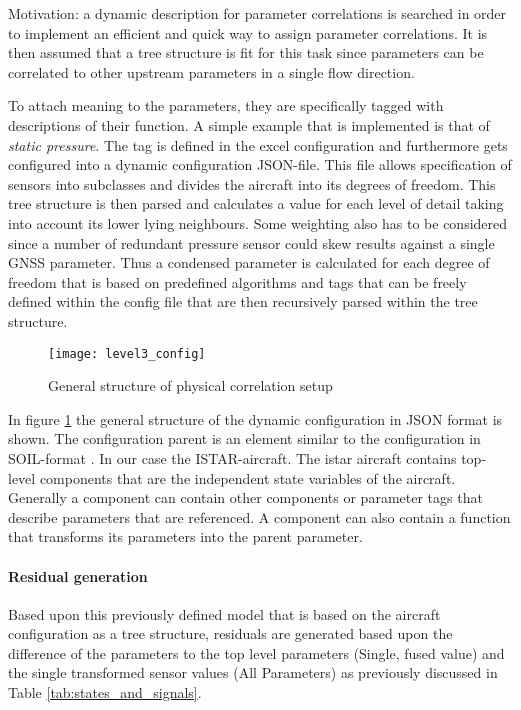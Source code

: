 Motivation: a dynamic description for parameter correlations is searched in order to implement an efficient and quick way to assign parameter correlations. It is then assumed that a tree structure is fit for this task since parameters can be correlated to other upstream parameters in a single flow direction.


To attach meaning to the parameters, they are specifically tagged with descriptions of their function. A simple example that is implemented is that of \textit{static pressure}. The tag is defined in the excel configuration and furthermore gets configured into a dynamic configuration JSON-file. This file allows specification of sensors into subclasses and divides the aircraft into its degrees of freedom. This tree structure is then parsed and calculates a value for each level of detail taking into account its lower lying neighbours. Some weighting also has to be considered since a number of redundant pressure sensor could skew results against a single GNSS parameter. Thus a condensed parameter is calculated for each degree of freedom that is based on predefined algorithms and tags that can be freely defined within the config file that are then recursively parsed within the tree structure.

\begin{figure}
    \centering
    \texttt{[image: level3\_config]}
    \caption{General structure of physical correlation setup}
    \label{fig:level3_config}
\end{figure}


In figure \ref{fig:level3_config} the general structure of the dynamic configuration in JSON format is shown. The configuration parent is an element similar to the configuration in SOIL-format \cite{behrens_domain-specific_2021}. In our case the ISTAR-aircraft. The istar aircraft contains top-level components that are the independent state variables of the aircraft. Generally a component can contain other components or parameter tags that describe parameters that are referenced. A component can also contain a function that transforms its parameters into the parent parameter.

\paragraph{Residual generation}
Based upon this previously defined model that is based on the aircraft configuration as a tree structure, residuals are generated based upon the difference of the parameters to the top level parameters (Single, fused value) and the single transformed sensor values (All Parameters) as previously discussed in Table \ref{tab:states_and_signals}.


